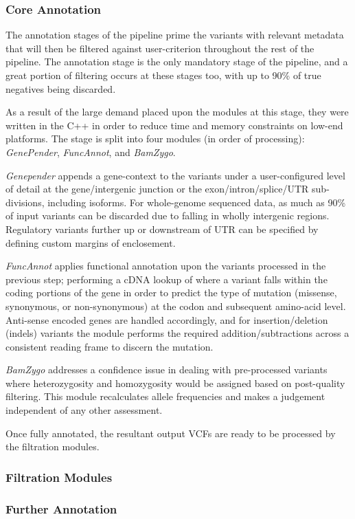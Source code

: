
\subsubsection{Core Annotation}

The annotation stages of the pipeline prime the variants with relevant metadata that will then be filtered against user-criterion throughout the rest of the pipeline. The annotation stage is the only mandatory stage of the pipeline, and a great portion of filtering occurs at these stages too, with up to 90\% of  true negatives being discarded.

As a result of the large demand placed upon the modules at this stage, they were written in the C++ in order to reduce time and memory constraints on low-end platforms. The stage is split into four modules (in order of processing): \textit{GenePender}, \textit{FuncAnnot}, and \textit{BamZygo}.

\textit{Genepender} appends a gene-context to the variants under a user-configured level of detail at the gene/intergenic junction or the exon/intron/splice/UTR sub-divisions, including isoforms. For whole-genome sequenced data, as much as 90\% of input variants can be discarded due to falling in wholly intergenic regions. Regulatory variants further up or downstream of UTR can be specified by defining custom margins of enclosement.



\textit{FuncAnnot} applies functional annotation upon the variants processed in the previous step; performing a cDNA lookup of where a variant falls within the coding portions of the gene in order to predict the type of mutation (missense, synonymous, or non-synonymous) at the codon and subsequent amino-acid level. Anti-sense encoded genes are handled accordingly, and for insertion/deletion (indels) variants the module performs the required addition/subtractions across a consistent reading frame to discern the mutation.

\textit{BamZygo} addresses a confidence issue in dealing with pre-processed variants where heterozygosity and homozygosity would be assigned based on post-quality filtering. This module recalculates allele frequencies and makes a judgement independent of any other assessment.

Once fully annotated, the resultant output VCFs are ready to be processed by the filtration modules.



\subsubsection{Filtration Modules}
\subsubsection{Further Annotation}
